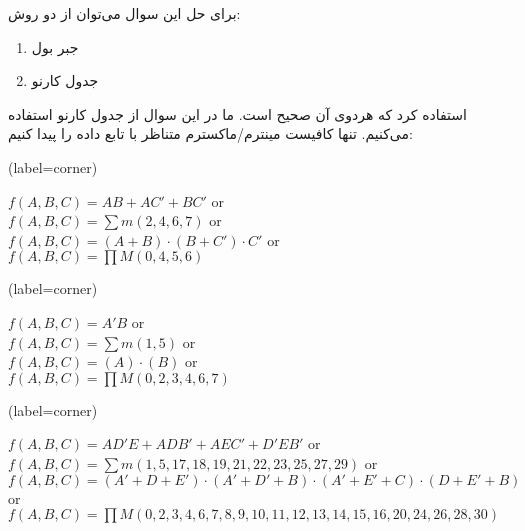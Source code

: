 
برای حل این سوال می‌توان از دو روش:
\begin{enumerate}
	\item 
	جبر بول
	\item 
	 جدول کارنو
\end{enumerate}
استفاده کرد که هردوی آن صحیح است. ما در این سوال از جدول کارنو استفاده می‌کنیم. تنها کافیست مینترم/ماکسترم متناظر با تابع داده را پیدا کنیم:



\begin{latin}
	\begin{minipage}{0.48\textwidth}
		\centering
		\begin{karnaugh-map}[4][2][1][$B$][$A$][$C$](label=corner)
		\end{karnaugh-map}

		$f(A,B,C)=AB+AC'+BC'$ or\\
		$f(A,B,C)=\sum m(2,4,6,7)$ or\\
		$f(A,B,C)=(A+B) \cdot (B+C') \cdot C'$ or\\
		$f(A,B,C)=\prod M(0,4,5,6)$
	\end{minipage}
	\hfill
	\begin{minipage}{0.48\textwidth}
		\centering
		\begin{karnaugh-map}[4][2][1][$B$][$A$][$C$](label=corner)
		\end{karnaugh-map}

		$f(A,B,C)=A'B$ or\\
		$f(A,B,C)=\sum m(1,5)$ or\\
		$f(A,B,C)=(A)\cdot (B)$ or\\
		$f(A,B,C)=\prod M(0,2,3,4,6,7)$
	\end{minipage}	
\end{latin}

\begin{latin}
	\centering
	\begin{karnaugh-map}[4][4][2][$C$][$B$][$E$][$D$][$A$](label=corner)
	\end{karnaugh-map}

	$f(A,B,C)=AD'E+ADB'+AEC'+D'EB'$ or\\
	$f(A,B,C)=\sum m(1,5,17,18,19,21,22,23,25,27,29)$ or\\
	$f(A,B,C)=(A'+D+E') \cdot (A'+D'+B) \cdot (A'+E'+C) \cdot (D+E'+B) $ or\\
	$f(A,B,C)=\prod M(0,2,3,4,6,7,8,9,10,11,12,13,14,15,16,20,24,26,28,30)$
\end{latin}
